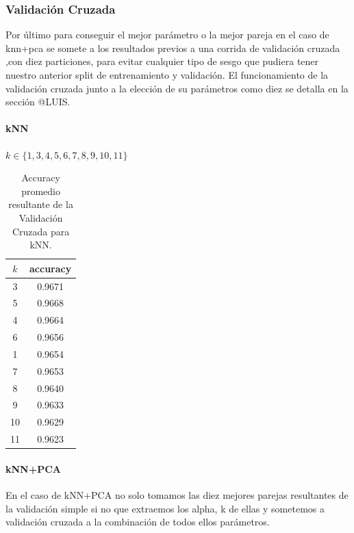 \subsubsection{Validación Cruzada}

Por último para conseguir el mejor parámetro o la mejor pareja en el caso de knn+pca se somete a los resultados previos a una corrida de validación cruzada ,con diez particiones, para evitar cualquier tipo de sesgo que pudiera tener nuestro anterior split de entrenamiento y validación. 
El funcionamiento de la validación cruzada junto a la elección de su parámetros como diez se detalla en la sección @LUIS.

\paragraph{kNN}


$ k \in \{1,3,4,5,6,7,8,9,10,11\}$

\begin{table}[h!]
    \begin{center}
        \begin{tabular}{|c|c|}
        \hline
        \textbf{$k$} & \textbf{accuracy} \\
        \hline
        3 &  0.9671\\
        5 & 0.9668\\
        4 & 0.9664\\
        6 & 0.9656\\
        1 &  0.9654\\
        7 & 0.9653\\
        8 & 0.9640\\
        9 & 0.9633\\
        10 & 0.9629\\
        11 & 0.9623\\
        
        \hline
        \end{tabular}
        \caption{Accuracy promedio resultante de la Validación Cruzada para kNN.}
        \label{knn_crossVal_table}
    \end{center}
\end{table}

\paragraph{kNN+PCA}

En el caso de kNN+PCA  no solo tomamos las diez mejores parejas resultantes de la validación simple si no que extraemos los alpha, k de ellas y sometemos a validación cruzada a la combinación de todos ellos parámetros.

